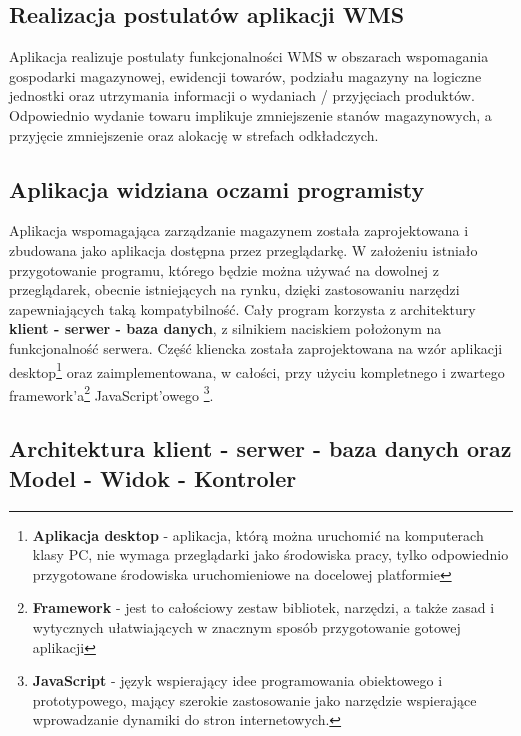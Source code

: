 	\subsection{Realizacja postulatów aplikacji WMS}
		Aplikacja realizuje postulaty funkcjonalności WMS w obszarach wspomagania gospodarki magazynowej,
		ewidencji towarów, podziału magazyny na logiczne jednostki oraz utrzymania informacji
		o wydaniach / przyjęciach produktów. Odpowiednio wydanie towaru implikuje zmniejszenie stanów
		magazynowych, a przyjęcie zmniejszenie oraz alokację w strefach odkładczych.
	\subsection{Aplikacja widziana oczami programisty}
		Aplikacja wspomagająca zarządzanie magazynem została zaprojektowana i zbudowana jako aplikacja
		dostępna przez przeglądarkę. W założeniu istniało przygotowanie programu, którego będzie można
		używać na dowolnej z przeglądarek, obecnie istniejących na rynku, dzięki zastosowaniu
		narzędzi zapewniających taką kompatybilność. Cały program korzysta z architektury
		\textbf{klient - serwer - baza danych}, z silnikiem naciskiem położonym na funkcjonalność
		serwera. Część kliencka została zaprojektowana na wzór aplikacji desktop\footnote{
			\textbf{Aplikacja desktop} - aplikacja, którą można uruchomić na komputerach klasy PC,
			nie wymaga przeglądarki jako środowiska pracy, tylko odpowiednio przygotowane
			środowiska uruchomieniowe na docelowej platformie		
		} oraz zaimplementowana, w całości, przy użyciu kompletnego i zwartego framework'a\footnote{
			\textbf{Framework} - jest to całościowy zestaw bibliotek, narzędzi, a także zasad i wytycznych
			ułatwiających w znacznym sposób przygotowanie gotowej aplikacji		
		} JavaScript'owego \footnote{
			\textbf{JavaScript} - język wspierający idee programowania obiektowego i prototypowego, mający
			szerokie zastosowanie jako narzędzie wspierające wprowadzanie dynamiki do stron
			internetowych. 		
		}.
	\subsection{Architektura klient - serwer - baza danych oraz Model - Widok - Kontroler}
